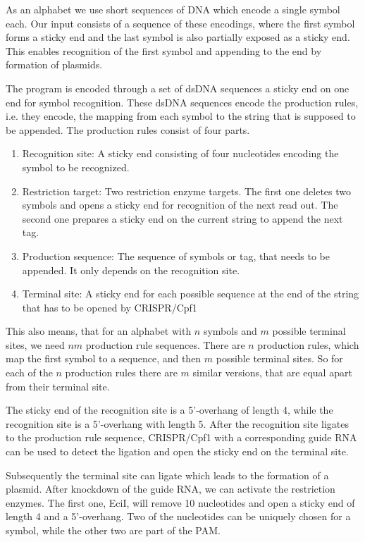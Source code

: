 \documentclass[
11pt, %
a4paper, %
oneside, %
headinclude,footinclude, %
BCOR5mm, %
]{scrartcl}
\begin{document}
As an alphabet we use short sequences of DNA which encode a single symbol each.
Our input consists of a sequence of these encodings, where the first symbol
forms a sticky end and the last symbol is also partially exposed as a sticky
end. This enables recognition of the first symbol and appending to the end by
formation of plasmids.

The program is encoded through a set of dsDNA sequences a sticky end on one end
for symbol recognition. These dsDNA sequences encode the production rules, i.e.
they encode, the mapping from each symbol to the string that is supposed to be
appended. The production rules consist of four parts.

\begin{enumerate}
  \item Recognition site: A sticky end consisting of four nucleotides encoding
    the symbol to be recognized.
  \item Restriction target: Two restriction enzyme targets. The first one
    deletes two symbols and opens a sticky end for recognition of the next
    read out. The second one prepares a sticky end on the current string to
    append the next tag.
  \item Production sequence: The sequence of symbols or tag, that needs to be
    appended. It only depends on the recognition site.
  \item Terminal site: A sticky end for each possible sequence at the end of
    the string that has to be opened by CRISPR/Cpf1
\end{enumerate}

This also means, that for an alphabet with $n$ symbols and $m$ possible terminal
sites, we need $nm$ production rule sequences. There are $n$ production rules,
which map the first symbol to a sequence, and then $m$ possible terminal sites.
So for each of the $n$ production rules there are $m$ similar versions, that are
equal apart from their terminal site.

The sticky end of the recognition site is a 5'-overhang of length 4, while the
recognition site is a 5'-overhang with length 5. After the recognition site
ligates to the production rule sequence, CRISPR/Cpf1 with a corresponding guide
RNA can be used to detect the ligation and open the sticky end on the terminal
site.

Subsequently the terminal site can ligate which leads to the formation of a
plasmid. After knockdown of the guide RNA, we can activate the restriction
enzymes. The first one, EciI, will remove 10 nucleotides and open a sticky end
of length 4 and a 5'-overhang. Two of the nucleotides can be uniquely chosen for
a symbol, while the other two are part of the PAM.
\end{document}
